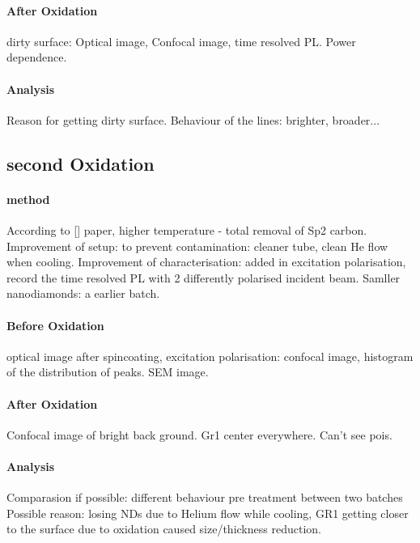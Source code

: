 \paragraph{After Oxidation}dirty surface: Optical image, Confocal image, time resolved PL. Power dependence.

\paragraph{Analysis} Reason for getting dirty surface. Behaviour of the lines: brighter, broader...

\subsection[Second Oxidation]{second Oxidation}

\paragraph{method} According to [] paper, higher temperature - total removal of Sp2 carbon. Improvement of setup: to prevent contamination: cleaner tube, clean He flow when cooling. Improvement of characterisation: added in excitation polarisation, record the time resolved PL with 2 differently polarised incident beam. Samller nanodiamonds: a earlier batch.

\paragraph{Before Oxidation} optical image after spincoating, excitation polarisation: confocal image, histogram of the distribution of peaks. SEM image.

\paragraph{After Oxidation} Confocal image of bright back ground. Gr1 center everywhere. Can't see pois.

\paragraph{Analysis} 
Comparasion if possible: different behaviour pre treatment between two batches
Possible reason: losing NDs due to Helium flow while cooling, GR1 getting closer to the surface due to oxidation caused size/thickness reduction.



